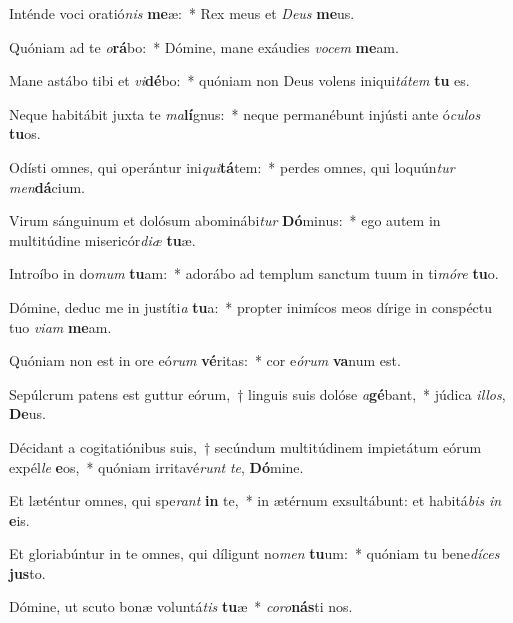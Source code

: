 \item Inténde voci oratió\textit{nis} \textbf{me}æ:~* Rex meus et \textit{De}\textit{us} \textbf{me}us.
\item Quóniam ad te \textit{o}\textbf{rá}bo:~* Dómine, mane exáudies \textit{vo}\textit{cem} \textbf{me}am.
\item Mane astábo tibi et \textit{vi}\textbf{dé}bo:~* quóniam non Deus volens iniqui\textit{tá}\textit{tem} \textbf{tu} es.
\item Neque habitábit juxta te \textit{ma}\textbf{lí}gnus:~* neque permanébunt injústi ante ó\textit{cu}\textit{los} \textbf{tu}os.
\item Odísti omnes, qui operántur ini\textit{qui}\textbf{tá}tem:~* perdes omnes, qui loquún\textit{tur} \textit{men}\textbf{dá}cium.
\item Virum sánguinum et dolósum abominábi\textit{tur} \textbf{Dó}minus:~* ego autem in multitúdine misericór\textit{di}\textit{æ} \textbf{tu}æ.
\item Introíbo in do\textit{mum} \textbf{tu}am:~* adorábo ad templum sanctum tuum in ti\textit{mó}\textit{re} \textbf{tu}o.
\item Dómine, deduc me in justíti\textit{a} \textbf{tu}a:~* propter inimícos meos dírige in conspéctu tuo \textit{vi}\textit{am} \textbf{me}am.
\item Quóniam non est in ore eó\textit{rum} \textbf{vé}ritas:~* cor e\textit{ó}\textit{rum} \textbf{va}num est.
\item Sepúlcrum patens est guttur eórum,~† linguis suis dolóse \textit{a}\textbf{gé}bant,~* júdica \textit{il}\textit{los}, \textbf{De}us.
\item Décidant a cogitatiónibus suis,~† secúndum multitúdinem impietátum eórum expél\textit{le} \textbf{e}os,~* quóniam irritavé\textit{runt} \textit{te}, \textbf{Dó}mine.
\item Et læténtur omnes, qui spe\textit{rant} \textbf{in} te,~* in ætérnum exsultábunt: et habitá\textit{bis} \textit{in} \textbf{e}is.
\item Et gloriabúntur in te omnes, qui díligunt no\textit{men} \textbf{tu}um:~* quóniam tu bene\textit{dí}\textit{ces} \textbf{jus}to.
\item Dómine, ut scuto bonæ voluntá\textit{tis} \textbf{tu}æ~* \textit{co}\textit{ro}\textbf{nás}ti nos.

